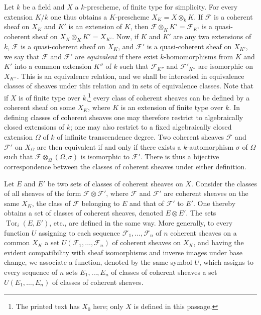 Let $k$ be a field and $X$ a $k$-prescheme, of finite type for simplicity. For
every extension $K/k$ one thus obtains a $K$-prescheme
$X_K=X\otimes_k K$. If $\mathcal F$ is a coherent sheaf on $X_K$ and $K'$ is
an extension of $K$, then $\mathcal F\otimes_K K'=\mathcal F_{K'}$ is a
quasi-coherent sheaf on $X_K\otimes_K K'=X_{K'}$. Now, if $K$ and $K'$ are
any two extensions of $k$, $\mathcal F$ is a quasi-coherent sheaf on $X_K$,
and $\mathcal F'$
is a quasi-coherent sheaf on $X_{K'}$, we say that $\mathcal F$ and
$\mathcal F'$ are \emph{equivalent} if there exist $k$-homomorphisms from
$K$ and $K'$ into a common extension $K''$ of $k$ such that
$\mathcal F_{K''}$ and $\mathcal F'_{K''}$ are isomorphic on $X_{K''}$. This
is an equivalence relation, and we shall be interested in equivalence classes
of sheaves under this relation and in sets of equivalence classes. Note that
if $X$ is of finite type over $k$,\footnote{The printed text has $X_0$ here;
only $X$ is defined in this passage.} every class of coherent sheaves can be
defined by a coherent sheaf on some $X_K$, where $K$ is an extension of finite
type over $k$. In defining classes of coherent sheaves one may therefore
restrict to algebraically closed extensions of $k$; one may also restrict to a
fixed algebraically closed extension $\Omega$ of $k$ of infinite
transcendence degree. Two coherent sheaves $\mathcal F$ and $\mathcal F'$ on
$X_\Omega$ are then equivalent if and only if there exists a
$k$-automorphism $\sigma$ of $\Omega$ such that
$\mathcal F\otimes_\Omega(\Omega,\sigma)$ is isomorphic to $\mathcal F'$.
There is thus a bijective correspondence between the classes of coherent
sheaves under either definition.

Let $E$ and $E'$ be two sets of classes of coherent sheaves on $X$. Consider
the classes of all sheaves of the form $\mathcal F\otimes\mathcal F'$, where
$\mathcal F$ and $\mathcal F'$ are coherent sheaves on the same $X_K$, the
class of $\mathcal F$ belonging to $E$ and that of $\mathcal F'$ to $E'$. One
thereby obtains a set of classes of coherent sheaves, denoted $E\otimes E'$.
The sets $\operatorname{Tor}_i(E,E')$, etc., are defined in the same way. More
generally, to every function $U$ assigning to each sequence
$\mathcal F_1,\ldots,\mathcal F_n$ of $n$ coherent sheaves on a common $X_K$
a set $U(\mathcal F_1,\ldots,\mathcal F_n)$ of coherent sheaves on $X_K$, and
having the evident compatibility with sheaf isomorphisms and inverse images
under base change, we associate a function, denoted by the same symbol $U$,
which assigns to every sequence of $n$ sets $E_1,\ldots,E_n$ of classes of
coherent sheaves a set $U(E_1,\ldots,E_n)$ of classes of coherent sheaves.

